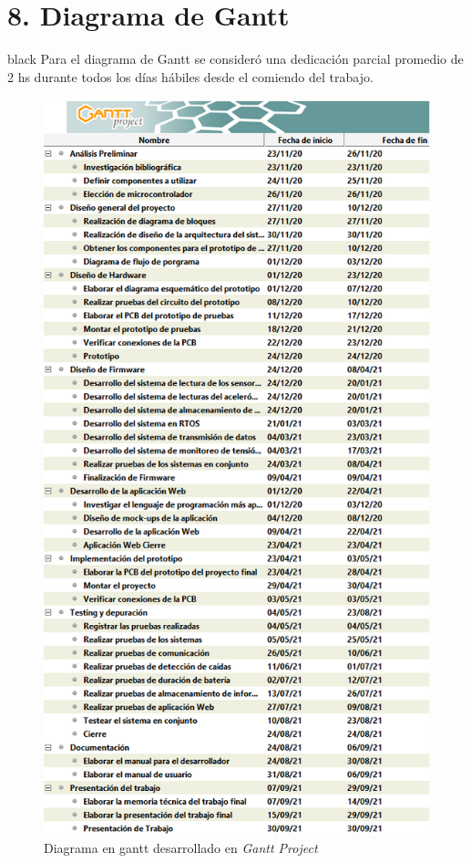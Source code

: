\documentclass[11pt]{charter}
\begin{document}
\section{8. Diagrama de Gantt}
\label{sec:gantt}

\begin{consigna}{black}
Para el diagrama de Gantt se consideró una dedicación parcial promedio de 2 hs durante todos los días hábiles desde el comiendo del trabajo.
\begin{figure}[htpb]

\centering 
\includegraphics[width=.8\textwidth]{./Figuras/DiagramaGantt_Nombres.png}
\caption{Diagrama en gantt desarrollado en \textit{Gantt Project}}
\label{fig:gantt1}
\end{figure}
\vspace{-15px}

\end{consigna}
\end{document}
